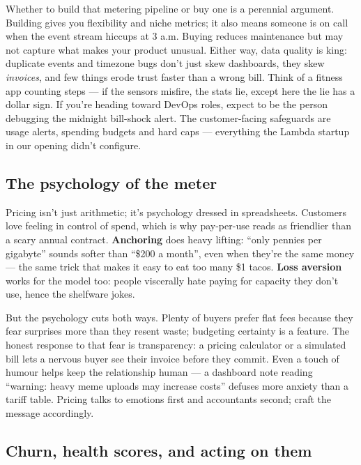 Whether to build that metering pipeline or buy one is a perennial argument. Building gives you flexibility and niche metrics; it also means someone is on call when the event stream hiccups at 3 a.m. Buying reduces maintenance but may not capture what makes your product unusual. Either way, data quality is king: duplicate events and timezone bugs don't just skew dashboards, they skew \emph{invoices}, and few things erode trust faster than a wrong bill. Think of a fitness app counting steps — if the sensors misfire, the stats lie, except here the lie has a dollar sign. If you're heading toward DevOps roles, expect to be the person debugging the midnight bill-shock alert. The customer-facing safeguards are usage alerts, spending budgets and hard caps — everything the Lambda startup in our opening didn't configure.



\subsection{The psychology of the meter}


Pricing isn't just arithmetic; it's psychology dressed in spreadsheets. Customers love feeling in control of spend, which is why pay-per-use reads as friendlier than a scary annual contract. \textbf{Anchoring} does heavy lifting: ``only pennies per gigabyte'' sounds softer than ``\$200 a month'', even when they're the same money — the same trick that makes it easy to eat too many \$1 tacos. \textbf{Loss aversion} works for the model too: people viscerally hate paying for capacity they don't use, hence the shelfware jokes.


But the psychology cuts both ways. Plenty of buyers prefer flat fees because they fear surprises more than they resent waste; budgeting certainty is a feature. The honest response to that fear is transparency: a pricing calculator or a simulated bill lets a nervous buyer see their invoice before they commit. Even a touch of humour helps keep the relationship human — a dashboard note reading ``warning: heavy meme uploads may increase costs'' defuses more anxiety than a tariff table. Pricing talks to emotions first and accountants second; craft the message accordingly.



\subsection{Churn, health scores, and acting on them}


